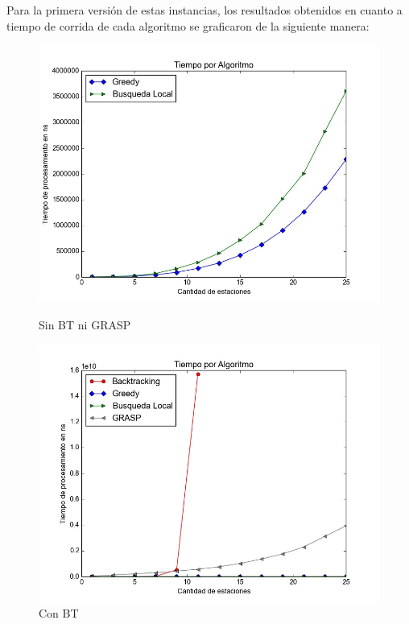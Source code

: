         Para la primera versión de estas instancias, los resultados obtenidos en cuanto a tiempo de corrida de cada algoritmo se graficaron de la siguiente manera:

        \blindtext

        \begin{figure}[H]
          \includegraphics[width=\linewidth]{imagenes/exp1a_ej5_tiempo_sin_BT.jpeg}
          \caption{Sin BT ni GRASP}
        \endminipage\hfill
          \includegraphics[width=\linewidth]{imagenes/exp1a_ej5_tiempo_con_BT.jpeg}
          \caption{Con BT}
        \endminipage
        \end{figure}


